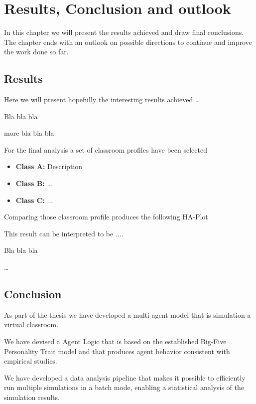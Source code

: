 \chapter{Results, Conclusion and outlook}
In this chapter we will present the results achieved and draw final conclusions.
The chapter ends with an outlook on possible directions to continue and improve
the work done so far.

\section{Results}
Here we will present hopefully the interesting results achieved \dots

Bla bla bla

more bla bla bla

For the final analysis a set of classroom profiles have been selected

\begin{itemize}
    \item \textbf{Class A:} Description
    \item \textbf{Class B:} ...
    \item \textbf{Class C:} ...
\end{itemize}

Comparing those classroom profile produces the following HA-Plot

\begin{figure}[H]
\end{figure}

This result can be interpreted to be ....

Bla bla bla

\dots


\section{Conclusion}
As part of the thesis we have developed a multi-agent model that is simulation a virtual classroom.

We have devised a Agent Logic that is based on the established Big-Five Personality
Trait model and that produces agent behavior consistent with empirical studies.

We have developed a data analysis pipeline that makes it possible to efficiently
run multiple simulations in a batch mode, enabling a statistical analysis of the
simulation results.


